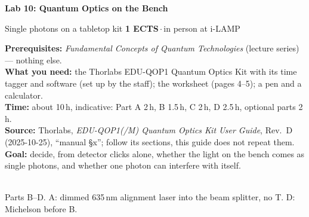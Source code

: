 \documentclass[a4paper,11pt]{article}
\begin{document}
{\LARGE\bfseries\color{ibmblue} Lab 10: Quantum Optics on the Bench}\par
\vspace{2pt}
{\large Single photons on a tabletop kit}\hfill
\textbf{1 ECTS}\,$\cdot$\,in person at i-LAMP\par
\vspace{4pt}
\textbf{Prerequisites:} \textit{Fundamental Concepts of Quantum Technologies} (lecture
series) --- nothing else.\\
\textbf{What you need:} the Thorlabs EDU-QOP1 Quantum Optics Kit with its time tagger and
software (set up by the staff); the worksheet (pages 4--5); a pen and a calculator.\\
\textbf{Time:} about 10\,h, indicative: Part A 2\,h, B 1.5\,h, C 2\,h, D 2.5\,h, optional
parts 2\,h.\\
{\footnotesize\textbf{Source:} Thorlabs, \textit{EDU-QOP1(/M) Quantum Optics Kit User Guide},
Rev.~D (2025-10-25), ``manual \S x''; follow its sections, this guide does not repeat them.}\\
\textbf{Goal:} decide, from detector clicks alone, whether the light on the bench comes as
single photons, and whether one photon can interfere with itself.

\begin{center}
\\[-1pt]
{\footnotesize Parts B--D. A: dimmed 635\,nm alignment laser into the beam splitter, no T. D: Michelson before B.}
\end{center}
\end{document}
